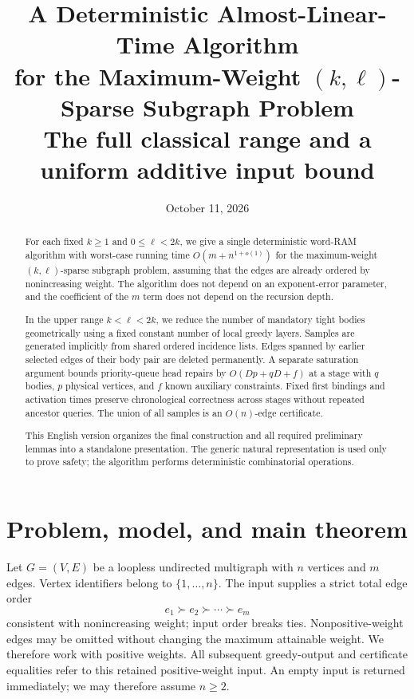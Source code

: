 \documentclass[11pt,a4paper]{article}
\title{A Deterministic Almost-Linear-Time Algorithm\\
 for the Maximum-Weight $(k,\ell)$-Sparse Subgraph Problem\\[4pt]
 \large The full classical range and a uniform additive input bound}
\author{}
\date{October 11, 2026}
\theoremstyle{definition}
\theoremstyle{remark}
\begin{document}
\maketitle

\begin{abstract}
For each fixed $k\geq1$ and $0\leq\ell<2k$, we give a single
deterministic word-RAM algorithm with worst-case running time
$O(m+n^{1+o(1)})$ for the maximum-weight $(k,\ell)$-sparse
subgraph problem, assuming that the edges are already ordered
by nonincreasing weight. The algorithm does not depend on an
exponent-error parameter, and the coefficient of the $m$ term
does not depend on the recursion depth.

In the upper range $k<\ell<2k$, we reduce the number of mandatory
tight bodies geometrically using a fixed constant number of local
greedy layers. Samples are generated implicitly from shared ordered
incidence lists. Edges spanned by earlier selected edges of their
body pair are deleted permanently. A separate saturation argument
bounds priority-queue head repairs by $O(Dp+qD+f)$ at a stage with
$q$ bodies, $p$ physical vertices, and $f$ known auxiliary constraints.
Fixed first bindings and activation times preserve chronological
correctness across stages without repeated ancestor queries.
The union of all samples is an $O(n)$-edge certificate.

This English version organizes the final construction and all
required preliminary lemmas into a standalone presentation.
The generic natural representation is used only to prove safety;
the algorithm performs deterministic combinatorial operations.
\end{abstract}

\tableofcontents

\section{Problem, model, and main theorem}
\label{sec:problem}

Let $G=(V,E)$ be a loopless undirected multigraph with $n$ vertices
and $m$ edges. Vertex identifiers belong to $\{1,\ldots,n\}$.
The input supplies a strict total edge order
\[
 e_1\succ e_2\succ\cdots\succ e_m
\]
consistent with nonincreasing weight; input order breaks ties.
Nonpositive-weight edges may be omitted without changing the
maximum attainable weight. We therefore work with positive weights.
All subsequent greedy-output and certificate equalities refer to this
retained positive-weight input. An empty input is returned immediately;
we may therefore assume $n\geq2$.
\end{document}
